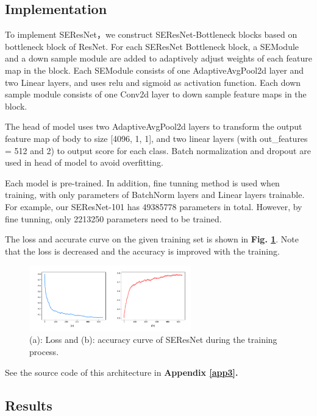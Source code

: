 \documentclass[10pt,twocolumn,letterpaper]{article}
\begin{document}
\subsection{Implementation}

To implement \textsf{SEResNet}，we construct  \textsf{SEResNet}-Bottleneck blocks based on bottleneck block of \textsf{ResNet}. For each \textsf{SEResNet} Bottleneck block, a SEModule and a down sample module are added to adaptively adjust weights of each feature map in the block. Each SEModule consists of one AdaptiveAvgPool2d layer and two Linear layers, and uses relu and sigmoid as activation function. Each down sample module consists of one Conv2d layer to down sample feature maps in the block.

The head of model uses two AdaptiveAvgPool2d layers to transform the output feature map of body to size [4096, 1, 1], and two linear layers (with out\_features = 512 and 2) to output score for each class. Batch normalization and dropout are used in head of model to avoid overfitting.

Each model is pre-trained. In addition, fine tunning method is used when training, with only parameters of BatchNorm layers and Linear layers trainable. For example, our \textsf{SEResNet-101} has 49385778 parameters in total. However, by fine tunning, only 2213250 parameters need to be trained.

The loss and accurate curve on the given training set is shown in \textbf{Fig. \ref{seres_acc}}. Note that the loss is decreased and the accuracy is improved with the training.

\begin{figure}[h]
\centering
\includegraphics[width=7cm]{seres_acc.pdf}
\caption{(a): Loss and (b): accuracy curve of \textsf{SEResNet} during the training process.}
\label{seres_acc}
\end{figure}

See the source code of this architecture in \textbf{Appendix \ref{app3}.}

\subsection{Results}
\end{document}
